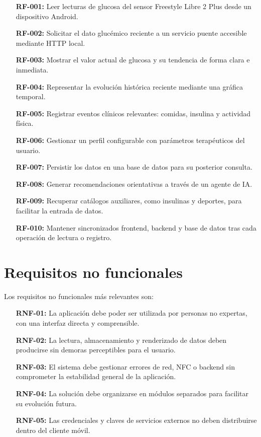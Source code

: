 \begin{itemize}
    \item[\textbf{RF-001:}] Leer lecturas de glucosa del sensor Freestyle Libre 2 Plus
          desde un dispositivo Android.
    \item[\textbf{RF-002:}] Solicitar el dato glucémico reciente a un servicio puente
          accesible mediante HTTP local.
    \item[\textbf{RF-003:}] Mostrar el valor actual de glucosa y su tendencia de forma
          clara e inmediata.
    \item[\textbf{RF-004:}] Representar la evolución histórica reciente mediante una
          gráfica temporal.
    \item[\textbf{RF-005:}] Registrar eventos clínicos relevantes: comidas, insulina y
          actividad física.
    \item[\textbf{RF-006:}] Gestionar un perfil configurable con parámetros terapéuticos
          del usuario.
    \item[\textbf{RF-007:}] Persistir los datos en una base de datos para su posterior
          consulta.
    \item[\textbf{RF-008:}] Generar recomendaciones orientativas a través de un agente
          de IA.
    \item[\textbf{RF-009:}] Recuperar catálogos auxiliares, como insulinas y deportes,
          para facilitar la entrada de datos.
    \item[\textbf{RF-010:}] Mantener sincronizados frontend, backend y base de datos tras
          cada operación de lectura o registro.
\end{itemize}

\section{Requisitos no funcionales}

Los requisitos no funcionales más relevantes son:

\begin{itemize}
    \item[\textbf{RNF-01:}] La aplicación debe poder ser utilizada por personas no
          expertas, con una interfaz directa y comprensible.
    \item[\textbf{RNF-02:}] La lectura, almacenamiento y renderizado de datos deben
          producirse sin demoras perceptibles para el usuario.
    \item[\textbf{RNF-03:}] El sistema debe gestionar errores de red, NFC o backend sin
          comprometer la estabilidad general de la aplicación.
    \item[\textbf{RNF-04:}] La solución debe organizarse en módulos separados para
          facilitar su evolución futura.
    \item[\textbf{RNF-05:}] Las credenciales y claves de servicios externos no deben
          distribuirse dentro del cliente móvil.
\end{itemize}

